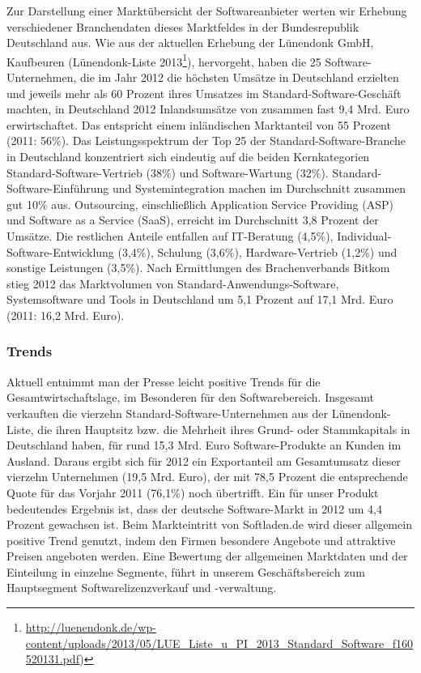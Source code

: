 Zur Darstellung einer Marktübersicht der Softwareanbieter werten wir Erhebung verschiedener Branchendaten dieses Marktfeldes in der Bundesrepublik Deutschland aus. Wie aus der aktuellen Erhebung der Lünendonk GmbH, Kaufbeuren (Lünendonk\textsuperscript{\textregistered}-Liste 2013\footnote[1]{\url{http://luenendonk.de/wp-content/uploads/2013/05/LUE_Liste_u_PI_2013_Standard_Software_f160520131.pdf})}), hervorgeht, haben die 25 Software-Unternehmen, die im Jahr 2012 die höchsten Umsätze in Deutschland erzielten und jeweils mehr als 60 Prozent ihres Umsatzes im Standard-Software-Geschäft machten, in Deutschland 2012 Inlandsumsätze von zusammen fast 9,4 Mrd. Euro erwirtschaftet. Das entspricht einem inländischen Marktanteil von 55 Prozent (2011: 56\%).
Das Leistungsspektrum der Top 25 der Standard-Software-Branche in Deutschland konzentriert sich eindeutig auf die beiden Kernkategorien Standard-Software-Vertrieb (38\%) und Software-Wartung (32\%). Standard-Software-Einführung und Systemintegration machen im Durchschnitt zusammen gut 10\% aus. Outsourcing, einschließlich Application Service Providing (ASP) und Software as a Service (SaaS), erreicht im Durchschnitt 3,8 Prozent der Umsätze. Die restlichen Anteile entfallen auf IT-Beratung (4,5\%), Individual-Software-Entwicklung (3,4\%), Schulung (3,6\%), Hardware-Vertrieb (1,2\%) und sonstige Leistungen (3,5\%).
Nach Ermittlungen des Brachenverbands Bitkom stieg 2012 das Marktvolumen von Standard-Anwendungs-Software, Systemsoftware und Tools in Deutschland um 5,1 Prozent auf 17,1 Mrd. Euro (2011: 16,2 Mrd. Euro).

\subsubsection{Trends}
Aktuell entnimmt man der Presse leicht positive Trends für die Gesamtwirtschaftslage, im Besonderen für den Softwarebereich. Insgesamt verkauften die vierzehn Standard-Software-Unternehmen aus der Lünendonk\textsuperscript{\textregistered}-Liste, die ihren Hauptsitz bzw. die Mehrheit ihres Grund- oder Stammkapitals in Deutschland haben, für rund 15,3 Mrd. Euro Software-Produkte an Kunden im Ausland. Daraus ergibt sich für 2012 ein Exportanteil am Gesamtumsatz dieser vierzehn Unternehmen (19,5 Mrd. Euro), der mit 78,5 Prozent die entsprechende Quote für das Vorjahr 2011 (76,1\%) noch übertrifft. Ein für unser Produkt bedeutendes Ergebnis ist, dass der deutsche Software-Markt in 2012 um 4,4 Prozent gewachsen ist. %
Beim Markteintritt von Softladen.de wird dieser allgemein positive Trend genutzt, indem den Firmen besondere Angebote und attraktive Preisen angeboten werden. Eine Bewertung der allgemeinen Marktdaten und der Einteilung in einzelne Segmente, führt in unserem Geschäftsbereich zum Hauptsegment Softwarelizenzverkauf und -verwaltung.

